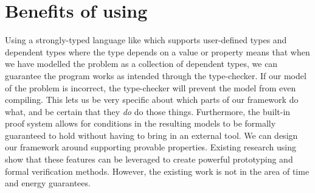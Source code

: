\section{Benefits of using \Idris}
	Using a strongly-typed language like \Idris which supports user-defined types and dependent types where the type depends on a value or property means that when we have modelled the problem as a collection of dependent types, we can guarantee the program works as intended through the type-checker. If our model of the problem is incorrect, the type-checker will prevent the model from even compiling. This lets us be very specific about which parts of our framework do what, and be certain that they \textit{do} do those things. Furthermore, the built-in proof system allows for conditions in the resulting models to be formally guaranteed to hold without having to bring in an external tool. We can design our framework around supporting provable properties. Existing research using \Idris \cite{5158855,brady2010correct,10.1007/978-3-642-27694-1_18} show that these features can be leveraged to create powerful prototyping and formal verification methods. However, the existing work is not in the area of time and energy guarantees.
